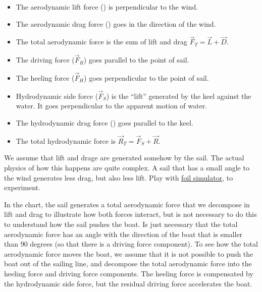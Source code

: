 \documentclass{article}
\begin{document}
\begin{itemize}
\item The aerodynamic lift force () is perpendicular to the
  wind.
\item The aerodynamic drag force () goes in the direction of
  the wind.
\item The total aerodynamic force is the sum of lift and drag
  $\overrightarrow{F}_T = \overrightarrow{L} + \overrightarrow{D}$.
\item The driving force ($\overrightarrow{F}_R$) goes parallel to the point of
  sail.
\item The heeling force ($\overrightarrow{F}_H$) goes perpendicular to the point
  of sail.
\item Hydrodynamic side force ($\overrightarrow{F}_S$) is the ``lift'' generated
  by the keel against the water. It goes perpendicular to the apparent motion of
  water.
\item The hydrodynamic drag force () goes parallel to the
  keel.
\item The total hydrodynamic force is $\overrightarrow{R}_T =
  \overrightarrow{F}_S + \overrightarrow{R}$.
\end{itemize}

We assume that lift and drage are generated somehow by the sail. The actual
physics of how this happens are quite complex. A sail that has a small angle to
the wind generates less drag, but also less lift. Play with
\href{https://www.grc.nasa.gov/www/k-12/airplane/foil3.html}{foil simulator}, to
experiment.

In the chart, the sail generates a total aerodynamic force that we decompose in
lift and drag to illustrate how both forces interact, but is not necessary to do
this to understand how the sail pushes the boat. Is just necessary that the
total aerodynamic force has an angle with the direction of the boat that is
smaller than 90 degrees (so that there is a driving force component). To see how
the total aerodynamic force moves the boat, we assume that it is not possible to
push the boat out of the sailing line, and decompose the total aerodynamic force
into the heeling force and driving force components. The heeling force is
compensated by the hydrodynamic side force, but the residual driving force
accelerates the boat.
\end{document}
